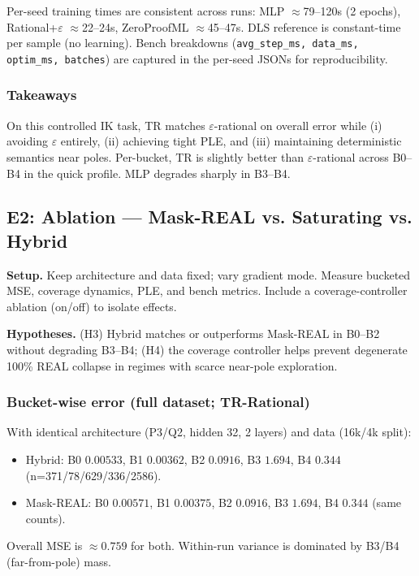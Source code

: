 \documentclass[11pt,twoside]{article}
\begin{document}
Per-seed training times are consistent across runs: MLP $\approx$79--120s (2 epochs), Rational+$\varepsilon$ $\approx$22--24s, ZeroProofML $\approx$45--47s. DLS reference is constant-time per sample (no learning). Bench breakdowns (\texttt{avg\_step\_ms, data\_ms, optim\_ms, batches}) are captured in the per-seed JSONs for reproducibility.

\subsubsection{Takeaways}

On this controlled IK task, TR matches $\varepsilon$-rational on overall error while (i) avoiding $\varepsilon$ entirely, (ii) achieving tight PLE, and (iii) maintaining deterministic semantics near poles. Per-bucket, TR is slightly better than $\varepsilon$-rational across B0--B4 in the quick profile. MLP degrades sharply in B3--B4.

\subsection{E2: Ablation --- Mask-REAL vs. Saturating vs. Hybrid}
\textbf{Setup.} Keep architecture and data fixed; vary gradient mode. Measure bucketed MSE, coverage dynamics, PLE, and bench metrics. Include a coverage-controller ablation (on/off) to isolate effects.

\textbf{Hypotheses.} (H3) Hybrid matches or outperforms Mask-REAL in B0--B2 without degrading B3--B4; (H4) the coverage controller helps prevent degenerate 100\% REAL collapse in regimes with scarce near-pole exploration.

\subsubsection{Bucket-wise error (full dataset; TR-Rational)}

With identical architecture (P3/Q2, hidden 32, 2 layers) and data (16k/4k split):
\begin{itemize}
  \item Hybrid: B0 $0.00533$, B1 $0.00362$, B2 $0.0916$, B3 $1.694$, B4 $0.344$ (n=371/78/629/336/2586).
  \item Mask-REAL: B0 $0.00571$, B1 $0.00375$, B2 $0.0916$, B3 $1.694$, B4 $0.344$ (same counts).
\end{itemize}
Overall MSE is $\approx0.759$ for both. Within-run variance is dominated by B3/B4 (far-from-pole) mass.
\end{document}
